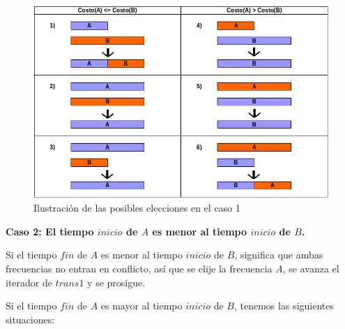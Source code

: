 \begin{figure}[htb]
  \begin{center}
      \includegraphics[scale=0.5]{imagenes/caso1.jpeg}
  \end{center}
  \caption{Ilustración de las posibles elecciones en el caso 1}\label{fig:caso1}
\end{figure}

{\bf Caso 2: El tiempo $inicio$ de $A$ es menor al tiempo $inicio$ de $B$.}

Si el tiempo $fin$ de $A$ es menor al tiempo $inicio$ de $B$, significa que ambas frecuencias no entran en conflicto, así que se elije la frecuencia $A$, se avanza el iterador de $trans1$ y se prosigue.

Si el tiempo $fin$ de $A$ es mayor al tiempo $inicio$ de $B$, tenemos las siguientes situaciones:

